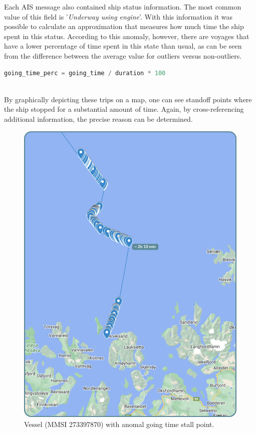 Each AIS message also contained ship status information. The most common value of this field is '\textit{Underway using engine}'. With this information it was possible to calculate an approximation that measures how much time the ship spent in this status.
According to this anomaly, however, there are voyages that have a lower percentage of time spent in this state than usual, as can be seen from the difference between the average value for outliers versus non-outliers.
\\
\begin{lstlisting}[language=Python]
    going_time_perc = going_time / duration * 100
\end{lstlisting} 
\\
By graphically depicting these trips on a map, one can see standoff points where the ship stopped for a substantial amount of time. Again, by cross-referencing additional information, the precise reason can be determined.


\begin{figure}[H]
    \centering
    \includegraphics[width=12cm]{Images/3/anomaly-3.png}
    \caption{Vessel (MMSI 273397870) with anomal going time stall point.}
\end{figure}
